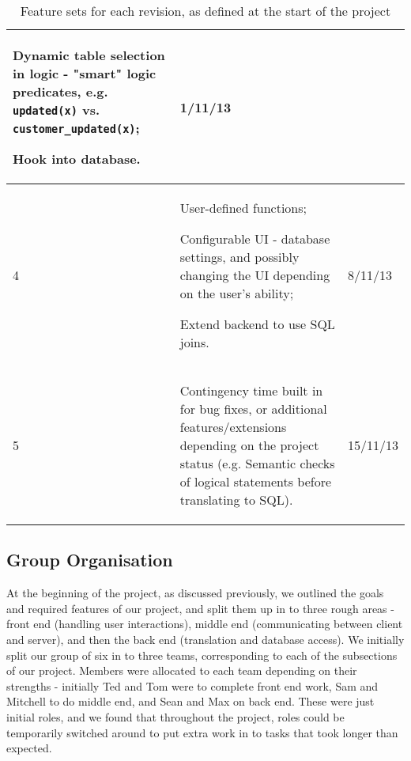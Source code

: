 \documentclass[a4paper, 11pt]{article}
\begin{document}
\begin{table}[H]
\begin{tabular}{| l | p{} | l |}
\begin{compactitem}
            \item Dynamic table selection in logic - "smart" logic predicates,
              e.g. \texttt{updated(x)} vs. \texttt{customer\_updated(x)};
            \item Hook into database.
          \end{compactitem}
          & 1/11/13 \\
        \hline
        4 &
          \begin{compactitem}
            \item User-defined functions;
            \item Configurable UI - database settings, and possibly changing the
              UI depending on the user's ability;
            \item Extend backend to use SQL joins.
          \end{compactitem}
          & 8/11/13 \\
        \hline
        5 &
          \begin{compactitem}
            \item Contingency time built in for bug fixes, or additional
              features/extensions depending on the project status (e.g. Semantic
              checks of logical statements before translating to SQL).
          \end{compactitem}
          & 15/11/13 \\
        \hline
      \end{tabular}
      \caption{Feature sets for each revision, as defined at the start of the
        project}
    \end{table}

  \subsection{Group Organisation}
    At the beginning of the project, as discussed previously, we outlined the
    goals and required features of our project, and split them up in to three
    rough areas - front end (handling user interactions),
    middle end (communicating between client and server), and
    then the back end (translation and database access).
    We initially split our group of six in to three teams,
    corresponding to each of the subsections of our project. Members were
    allocated to each team depending on their strengths - initially Ted and Tom
    were to complete front end work, Sam and Mitchell to do middle end, and
    Sean and Max on back end. These were just initial roles, and we found that
    throughout the project, roles could be temporarily switched around to put
    extra work in to tasks that took longer than expected.
\end{document}
